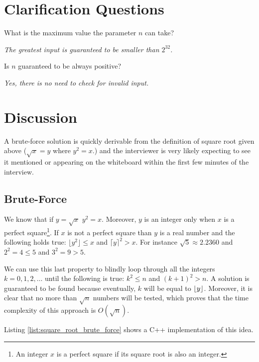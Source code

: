 \section{Clarification Questions}
\begin{QandA}
	\item What is the maximum value the parameter $n$ can take?
	\begin{answered}
		\textit{The greatest input is guaranteed to be smaller than $2^{32}$.}
	\end{answered}
	
	\item Is $n$ guaranteed to be always positive?
	\begin{answered}
		\textit{Yes, there is no need to check for invalid input.}
	\end{answered}
\end{QandA}

\section{Discussion}
A brute-force solution is quickly derivable from the definition of square root given above ($\sqrt{x} = y$ where $y^2 = x$.) and the interviewer
is very likely expecting to see it mentioned or appearing on the whiteboard
within the first few minutes of the interview. 

\subsection{Brute-Force}
We know that if $y = \sqrt{x}$ $y^2 = x$. Moreover, $y$ is an integer only when $x$ is a perfect square\footnote{An integer $x$ is a perfect square if its square root is also an integer.}. 
If $x$ is not a perfect square than $y$ is a real number and the following holds true: 
$\lfloor{y}^2 \rfloor \leq x$ and $\lceil{y} \rceil^2 > x$.
For instance $\sqrt{5} \approx 2.2360$ and $2^2=4 \leq 5$ and $3^2=9 > 5$.

We can use this last property to blindly loop through all the integers $k=0,1,2,\ldots$ until 
the following is true: $k^2\leq n$ and $(k+1)^2 > n$.
A solution is guaranteed to be found because eventually, $k$ will be equal to $\lfloor y\rfloor$.
Moreover, it is clear that no more than $\sqrt{n}$ numbers will be tested, which proves that the time complexity of this approach is $O(\sqrt{n})$.

Listing \ref{list:square_root_brute_force} shows a C++ implementation of this idea.


